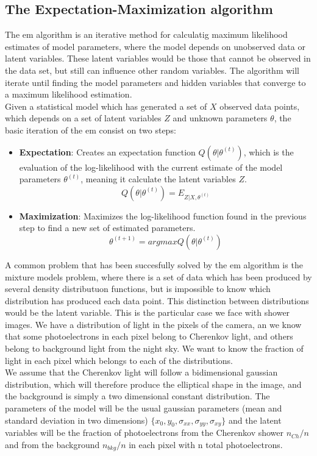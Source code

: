 \documentclass[main.tex]{subfiles}
\begin{document}
\subsection{The Expectation-Maximization algorithm}

The \gls{em} algorithm \cite{1977EM} is an iterative method for calculatig maximum likelihood estimates of model parameters, where the model depends on unobserved data or latent variables. These latent variables would be those that cannot be observed in the data set, but still can influence other random variables. The algorithm will iterate until finding the model parameters and hidden variables that converge to a maximum likelihood estimation.\\
Given a statistical model which has generated a set of $X$ observed data points, which depends on a set of latent variables $Z$ and unknown parameters $\theta$, the basic iteration of the \gls{em} consist on two steps:

\begin{itemize}
\item \textbf{Expectation}: Creates an expectation function $Q(\theta | \theta^{(t)})$, which is the evaluation of the log-likelihood with the current estimate of the model parameters $\theta^{(t)}$, meaning it calculate the latent variables $Z$.
  \begin{equation}
    Q(\theta | \theta^{(t)}) = E_{Z|X,\theta^(t)}
  \end{equation}
   
\item \textbf{Maximization}: Maximizes the log-likelihood function found in the previous step to find a new set of estimated parameters.
  \begin{equation}
    \theta^{(t+1)} = arg max Q(\theta | \theta^{(t)})
  \end{equation}  
\end{itemize}

A common problem that has been succesfully solved by the \gls{em} algorithm is the mixture models problem, where there is a set of data which has been produced by several density distributuon functions, but is impossible to know which distribution has produced each data point. This distinction between distributions would be the latent variable. This is the particular case we face with shower images. We have a distribution of light in the pixels of the camera, an we know that some photoelectrons in each pixel belong to Cherenkov light, and others belong to background light from the night sky. We want to know the fraction of light in each pixel which belongs to each of the distributions.\\
We assume that the Cherenkov light will follow a bidimensional gaussian distribution, which will therefore produce the elliptical shape in the image, and the background is simply a two dimensional constant distribution. The parameters of the model will be the usual gaussian parameters (mean and standard deviation in two dimensions) $\{x_{0}, y_{0},\sigma_{xx}, \sigma_{yy}, \sigma_{xy}\}$ and the latent variables will be the fraction of photoelectrons from the Cherenkov shower $n_{Ch}/n$ and from the background $n_{bkg}/n$ in each pixel with n total photoelectrons.\\
\end{document}
